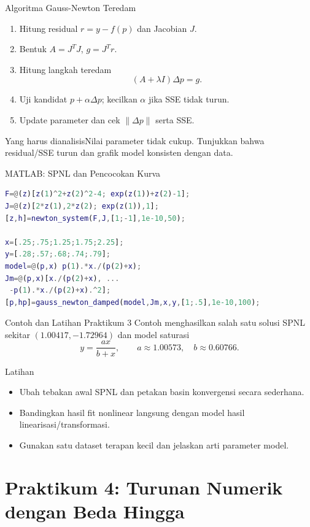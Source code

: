 \documentclass[slides,english,noindex,lean,nobackpage,nocopyright,noupdate,nosummary]{enacom}
\newcommand{\AnalysisBox}[1]{\begin{alertblock}{Yang harus dianalisis}#1\end{alertblock}}
\begin{document}
\begin{frame}{Algoritma Gauss-Newton Teredam}
\begin{enumerate}
\item Hitung residual $r=y-f(p)$ dan Jacobian $J$.
\item Bentuk $A=J^T J$, $g=J^T r$.
\item Hitung langkah teredam
\[
(A+\lambda I)\Delta p=g.
\]
\item Uji kandidat $p+\alpha\Delta p$; kecilkan $\alpha$ jika SSE tidak turun.
\item Update parameter dan cek $\|\Delta p\|$ serta SSE.
\end{enumerate}
\AnalysisBox{Nilai parameter tidak cukup. Tunjukkan bahwa residual/SSE turun dan grafik model konsisten dengan data.}
\end{frame}

\begin{frame}{MATLAB: SPNL dan Pencocokan Kurva}
\begin{lstlisting}[language=Matlab]
F=@(z)[z(1)^2+z(2)^2-4; exp(z(1))+z(2)-1];
J=@(z)[2*z(1),2*z(2); exp(z(1)),1];
[z,h]=newton_system(F,J,[1;-1],1e-10,50);

x=[.25;.75;1.25;1.75;2.25];
y=[.28;.57;.68;.74;.79];
model=@(p,x) p(1).*x./(p(2)+x);
Jm=@(p,x)[x./(p(2)+x), ...
 -p(1).*x./(p(2)+x).^2];
[p,hp]=gauss_newton_damped(model,Jm,x,y,[1;.5],1e-10,100);
\end{lstlisting}
\end{frame}

\begin{frame}{Contoh dan Latihan Praktikum 3}
Contoh menghasilkan salah satu solusi SPNL sekitar $(1.00417,-1.72964)$ dan model saturasi
\[
y=\frac{a x}{b+x},\qquad a\approx1.00573,\quad b\approx0.60766.
\]
\begin{exampleblock}{Latihan}
\begin{itemize}
\item Ubah tebakan awal SPNL dan petakan basin konvergensi secara sederhana.
\item Bandingkan hasil fit nonlinear langsung dengan model hasil linearisasi/transformasi.
\item Gunakan satu dataset terapan kecil dan jelaskan arti parameter model.
\end{itemize}
\end{exampleblock}
\end{frame}

\section{Praktikum 4: Turunan Numerik dengan Beda Hingga}
\end{document}
